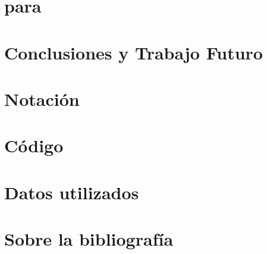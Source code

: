 \documentclass[utf8,11pt]{book}
\begin{document}
\chapter{\arm}
\label{chap:arm}





\chapter{\ARM para \Clasificacion}
\label{chap:clasificacion}





\chapter{Conclusiones y Trabajo Futuro}
\label{chap:conclusiones-y-trabajo-futuro}




\appendix

\chapter{Notación}
\label{apdx:notacion}


\chapter{Código}
\label{apdx:codigo}


\chapter{Datos utilizados}
\label{apdx:datos-utilizados}


\chapter{Sobre la bibliografía}
\thispagestyle{empty}
\label{chap:sobre-la-bibliografia}



\setcounter{footnote}{0}
% 
\printbibliography
{}


\cleardoublepage
\printindex
\end{document}
